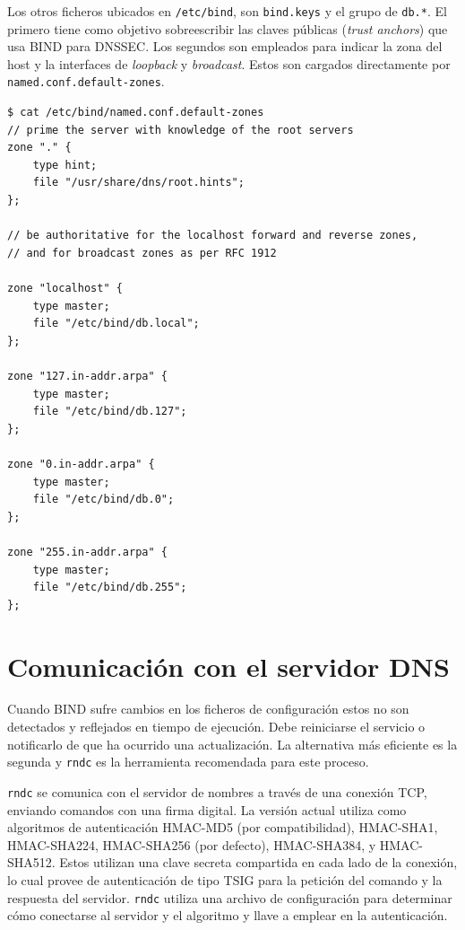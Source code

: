Los otros ficheros ubicados en \verb+/etc/bind+, son \verb+bind.keys+ y el grupo de \verb+db.*+. El primero tiene como objetivo sobreescribir las claves públicas (\textit{trust anchors}) que usa BIND para DNSSEC. Los segundos son empleados para indicar la zona del host y la interfaces de \textit{loopback} y \textit{broadcast}. Estos son cargados directamente por \verb+named.conf.default-zones+.

\begin{lstlisting}[frame=single, numbers=none, caption=Contenido del fichero \textbf{named.conf.default-zones}]
$ cat /etc/bind/named.conf.default-zones
// prime the server with knowledge of the root servers
zone "." {
    type hint;
    file "/usr/share/dns/root.hints";
};

// be authoritative for the localhost forward and reverse zones,
// and for broadcast zones as per RFC 1912

zone "localhost" {
    type master;
    file "/etc/bind/db.local";
};

zone "127.in-addr.arpa" {
    type master;
    file "/etc/bind/db.127";
};

zone "0.in-addr.arpa" {
    type master;
    file "/etc/bind/db.0";
};

zone "255.in-addr.arpa" {
    type master;
    file "/etc/bind/db.255";
};
\end{lstlisting}

\section{Comunicación con el servidor DNS}\label{section:comm-bind}

Cuando BIND sufre cambios en los ficheros de configuración estos no son detectados y reflejados en tiempo de ejecución. Debe reiniciarse el servicio o notificarlo de que ha ocurrido una actualización. La alternativa más eficiente es la segunda y \verb+rndc+ es la herramienta recomendada para este proceso.

\verb+rndc+ se comunica con el servidor de nombres a través de una conexión TCP, enviando comandos con una firma digital. La versión actual utiliza como algoritmos de autenticación HMAC-MD5 (por compatibilidad), HMAC-SHA1, HMAC-SHA224, HMAC-SHA256 (por defecto), HMAC-SHA384, y HMAC-SHA512. Estos utilizan una clave secreta compartida en cada lado de la conexión, lo cual provee de autenticación de tipo TSIG para la petición del comando y la respuesta del servidor. \verb+rndc+ utiliza una archivo de configuración para determinar cómo conectarse al servidor y el algoritmo y llave a emplear en la autenticación.


